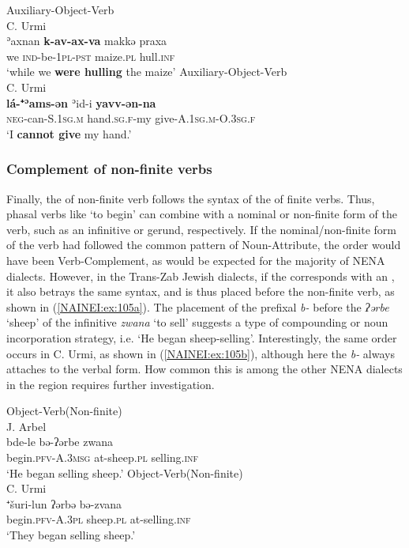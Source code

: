 \documentclass[output=paper,colorlinks,citecolor=brown,draftmode]{langscibook}
\begin{document}
\ea\label{NAINEI:ex:37}
\ea\label{NAINEI:ex:37a}
Auxiliary-Object-Verb\\
C. Urmi \citep[B17L\S 4]{Khan2016CUrmi} \\
\gll ʾaxnan \textbf{k-av-ax-va} makkə praxa \\
     we \textsc{ind-}be\textsc{-1pl-pst} maize\textsc{.pl} hull\textsc{.inf} \\
\glt `while we \textbf{were hulling} the maize'
\ex\label{NAINEI:ex:37b}
Auxiliary-Object-Verb\\
C. Urmi \citep[A16:\S 3]{Khan2016CUrmi} \\
\gll \textbf{lá-⁺ʾams-ən} ʾid-i \textbf{yavv-ən-na} \\
    \textsc{neg-}can\textsc{-S.1sg.m} hand\textsc{.sg.f-}my give-\textsc{A.1sg.m-O.3sg.f} \\
\glt `I \textbf{cannot give} my hand.'
\z
\z

\subsubsection{Complement of non-finite verbs}\label{NAINEI:sec:2.3.3}

Finally, the  of non-finite verb follows the syntax of the  of finite verbs. Thus, phasal verbs like `to begin' can combine with a nominal or non-finite form of the verb, such as an infinitive or gerund, respectively. If the nominal/non-finite form of the verb had followed the common pattern of Noun-Attribute, the order would have been Verb-Complement, as would be expected for the majority of NENA dialects. However, in the Trans-Zab Jewish dialects, if the  corresponds with an , it also betrays the same syntax, and is thus placed before the non-finite verb, as shown in (\ref{NAINEI:ex:105a}). The placement of the prefixal  \textit{b-} before the  \textit{ʔərbe} `sheep' of the infinitive \textit{zwana} `to sell' suggests a type of compounding or noun incorporation strategy, i.e. `He began sheep-selling'. Interestingly, the same order occurs in C. Urmi, as shown in (\ref{NAINEI:ex:105b}), although here the  \textit{b-} always attaches to the verbal form. How common this is among the other NENA dialects in the region requires further investigation.

\newpage
\ea\label{NAINEI:ex:105}
\ea\label{NAINEI:ex:105a}
Object-Verb(Non-finite)\\
J. Arbel \citep[S:§72]{Khan1999JArbel} \\ 
\gll bde-le bə-ʔərbe zwana \\
begin\textsc{.pfv}-\textsc{A.3msg} at-sheep\textsc{.pl} selling\textsc{.inf} \\
\glt `He began selling sheep.'
\ex\label{NAINEI:ex:105b}
Object-Verb(Non-finite)\\
C. Urmi  \\ 
\gll ⁺šuri-lun ʔərbə bə-zvana \\
begin\textsc{.pfv}-\textsc{A.3pl} sheep\textsc{.pl} at-selling\textsc{.inf} \\
\glt `They began selling sheep.'
\z
\z
\end{document}

